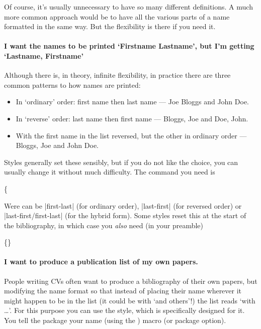 Of course, it's usually unnecessary to have so many different definitions. A much more common approach would be to have all the various parts of a name formatted in the same way. But the flexibility is there if you need it.


\paragraph{I want the names to be printed `Firstname Lastname', but I'm getting `Lastname, Firstname'} Although there is, in theory, infinite flexibility, in practice there are three common patterns to how names are printed:
\begin{itemize}
  \item In `ordinary' order: first name then last name --- Joe Bloggs and John Doe.
  \item In `reverse' order: last name then first name --- Bloggs, Joe and Doe, John.
  \item With the first name in the list reversed, but the other in ordinary order --- Bloggs, Joe and John Doe.
\end{itemize}
Styles generally set these sensibly, but if you do not like the choice, you can usually change it without much difficulty. The command you need is
\begin{pseudoverb}
\{
\end{pseudoverb}
Were  can be |first-last| (for ordinary order), |last-first| (for reversed order) or |last-first/first-last| (for the hybrid form). Some styles reset this at the start of the bibliography, in which case you \emph{also} need (in your preamble)
\begin{pseudoverb}
\{\}
\end{pseudoverb}

\paragraph{I want to produce a publication list of my own papers.} People writing CVs often want to produce a bibliography of their own papers, but modifying the name format so that instead of placing their name wherever it might happen to be in the list (it could be with `and others'!) the list reads `with \ldots'. For this purpose you can use the  style, which is specifically designed for it. You tell the package your name (using the ) macro (or package option).

